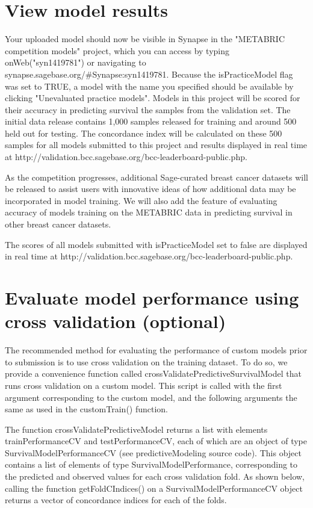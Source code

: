 \documentclass[10pt]{article}
\begin{document}
\section{View model results}
Your uploaded model should now be visible in Synapse in the "METABRIC competition models" project, which you can access by typing onWeb("syn1419781") or navigating to synapse.sagebase.org/\#Synapse:syn1419781. Because the isPracticeModel flag was set to TRUE, a model with the name you specified should be available by clicking "Unevaluated practice models". Models in this project will be scored for their accuracy in predicting survival the samples from the validation set. The initial data release contains 1,000 samples released for training and around 500 held out for testing. The concordance index will be calculated on these 500 samples for all models submitted to this project and results displayed in real time at http://validation.bcc.sagebase.org/bcc-leaderboard-public.php.

As the competition progresses, additional Sage-curated breast cancer datasets will be released to assist users with innovative ideas of how additional data may be incorporated in model training. We will also add the feature of evaluating accuracy of models training on the METABRIC data in predicting survival in other breast cancer datasets.

The scores of all models submitted with isPracticeModel set to false are displayed in real time at http://validation.bcc.sagebase.org/bcc-leaderboard-public.php.

\section{Evaluate model performance using cross validation (optional)}
The recommended method for evaluating the performance of custom models prior to submission is to use cross validation on the training dataset. To do so, we provide a convenience function called crossValidatePredictiveSurvivalModel that runs cross validation on a custom model. This script is called with the first argument corresponding to the custom model, and the following arguments the same as used in the customTrain() function.

The function crossValidatePredictiveModel returns a list with elements trainPerformanceCV and testPerformanceCV, each of which are an object of type SurvivalModelPerformanceCV (see predictiveModeling source code). This object contains a list of elements of type SurvivalModelPerformance, corresponding to the predicted and observed values for each cross validation fold. As shown below, calling the function getFoldCIndices() on a SurvivalModelPerformanceCV object returns a vector of concordance indices for each of the folds.
\end{document}
